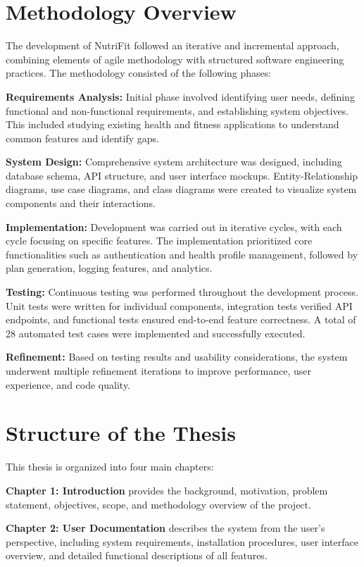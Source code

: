\section{Methodology Overview}

The development of NutriFit followed an iterative and incremental approach, combining elements of agile methodology with structured software engineering practices. The methodology consisted of the following phases:

\textbf{Requirements Analysis:} Initial phase involved identifying user needs, defining functional and non-functional requirements, and establishing system objectives. This included studying existing health and fitness applications to understand common features and identify gaps.

\textbf{System Design:} Comprehensive system architecture was designed, including database schema, API structure, and user interface mockups. Entity-Relationship diagrams, use case diagrams, and class diagrams were created to visualize system components and their interactions.

\textbf{Implementation:} Development was carried out in iterative cycles, with each cycle focusing on specific features. The implementation prioritized core functionalities such as authentication and health profile management, followed by plan generation, logging features, and analytics.

\textbf{Testing:} Continuous testing was performed throughout the development process. Unit tests were written for individual components, integration tests verified API endpoints, and functional tests ensured end-to-end feature correctness. A total of 28 automated test cases were implemented and successfully executed.

\textbf{Refinement:} Based on testing results and usability considerations, the system underwent multiple refinement iterations to improve performance, user experience, and code quality.

\section{Structure of the Thesis}

This thesis is organized into four main chapters:

\textbf{Chapter 1: Introduction} provides the background, motivation, problem statement, objectives, scope, and methodology overview of the project.

\textbf{Chapter 2: User Documentation} describes the system from the user's perspective, including system requirements, installation procedures, user interface overview, and detailed functional descriptions of all features.

